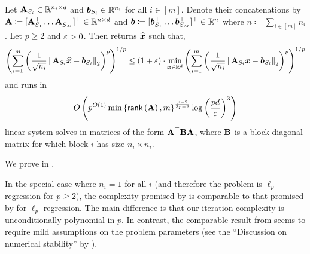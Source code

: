\begin{mainthm}\label{mainthm:gp_regression_iteration_complexity}
Let $\mathbf{A}_{S_i} \in \mathbb{R}^{n_i \times d}$ and $\bm{b}_{S_i} \in \mathbb{R}^{n_i}$ for all $i\in[m]$. Denote their concatenations by $\mathbf{A}\coloneqq [\mathbf{A}_{S_1}^{\top} \dots \mathbf{A}_{S_M}^{\top}]^{\top}\in\mathbb{R}^{n\times d}$ and $\vb \coloneqq [\vb_{S_1}^{\top}\dots\vb_{S_M}^{\top}]^{\top}\in \R^n$ where $n \coloneqq \sum_{i\in[m]}n_i$. Let $p \ge 2$ and $\varepsilon > 0$. Then  returns $\widehat{\bm{x}}$ such that,
\begin{align}\label{eq:interpolation_approx}
    \left(\sum_{i=1}^m \left(\frac{1}{\sqrt{n_i}}\left\lVert \mathbf{A}_{S_i}\widehat{\bm{x}}-\bm{b}_{S_i} \right\rVert_2\right)^p\right)^{1/p} \le (1+\varepsilon)\cdot\min_{\bm{x}\in\mathbb{R}^d}\left(\sum_{i=1}^m \left(\frac{1}{\sqrt{n_i}}\left\lVert \mathbf{A}_{S_i}\bm{x}-\bm{b}_{S_i} \right\rVert_2\right)^p\right)^{1/p}
\end{align}
and runs in
\begin{align*}          
    O\left(p^{O(1)}\min\left\{\mathsf{rank}\left(\mathbf{A}\right),m\right\}^{\frac{p-2}{3p-2}}\log\left(\frac{pd}{\varepsilon}\right)^3\right)
\end{align*}
linear-system-solves in matrices of the form $\mathbf{A}^{\top}\mathbf{B}\mathbf{A}$, where $\mathbf{B}$ is a block-diagonal matrix for which block $i$ has size $n_i \times n_i$.
\end{mainthm}
We prove  in .

In the special case where $n_i=1$ for all $i$ (and therefore the problem is $\ell_p$ regression for $p \ge 2$), the complexity promised by  is comparable to that promised by \citet{jls21} for $\ell_p$ regression. The main difference is that our iteration complexity is unconditionally polynomial in $p$. In contrast, the comparable result from \cite{jls21} seems to require mild assumptions on the problem parameters (see the ``Discussion on numerical stability'' by \citet[Section 4]{jls21}).

